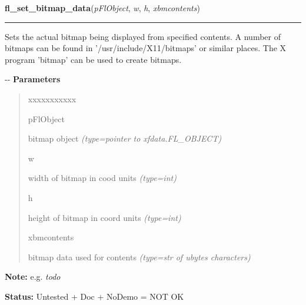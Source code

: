    \label{xformslib:flbitmap:fl_set_bitmap_data}

    \vspace{0.5ex}

\hspace{.8\funcindent}\begin{boxedminipage}{\funcwidth}

    \raggedright \textbf{fl\_set\_bitmap\_data}(\textit{pFlObject}, \textit{w}, \textit{h}, \textit{xbmcontents})

    \vspace{-1.5ex}

    \rule{\textwidth}{0.5\fboxrule}
\setlength{\parskip}{2ex}

Sets the actual bitmap being displayed from specified contents. A
number of bitmaps can be found in '/usr/include/X11/bitmaps' or similar
places. The X program 'bitmap' can be used to create bitmaps.

-{}-
\setlength{\parskip}{1ex}
      \textbf{Parameters}
      \vspace{-1ex}

      \begin{quote}
        \begin{Ventry}{xxxxxxxxxxx}

          \item[pFlObject]


bitmap object
            {\it (type=pointer to xfdata.FL\_OBJECT)}

          \item[w]


width of bitmap in cood units
            {\it (type=int)}

          \item[h]


height of bitmap in coord units
            {\it (type=int)}

          \item[xbmcontents]


bitmap data used for contents
            {\it (type=str of ubytes characters)}

        \end{Ventry}

      \end{quote}

\textbf{Note:} 
e.g. \emph{todo}


\textbf{Status:} 
Untested + Doc + NoDemo = NOT OK


    \end{boxedminipage}

